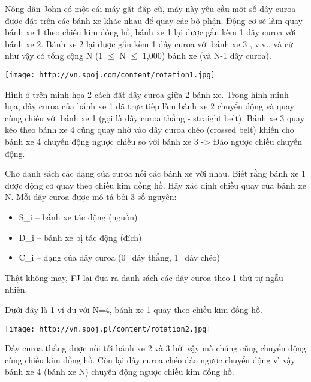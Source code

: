 Nông dân John có một cái máy gặt đập cũ, máy này yêu cầu một số dây  curoa được đặt trên các bánh xe khác nhau để quay các bộ phận. Động cơ sẽ làm quay bánh xe 1 theo chiều kim đồng hồ, bánh xe 1 lại được gắn kèm 1  dây curoa với bánh xe 2. Bánh xe 2 lại được gắn kèm 1 dây curoa với bánh xe 3  , v.v.. và cứ như vậy có tổng cộng N (1  $\le$  N  $\le$  1,000) bánh xe (và N-1 dây curoa).  


\texttt{[image: http://vn.spoj.com/content/rotation1.jpg]}

   Hình ở trên minh họa 2 cách đặt dây curoa giữa 2 bánh xe. Trong hình minh họa, dây curoa của bánh xe 1 đã trực tiếp làm bánh xe 2 chuyển động và quay cùng chiều với bánh xe 1 (gọi là dây curoa thẳng - straight belt). Bánh xe 3 quay kéo theo bánh xe 4 cũng quay nhờ vào dây curoa chéo (crossed belt) khiến cho bánh xe 4 chuyển động ngược chiều so với bánh xe 3 -> Đảo  ngược chiều chuyển động.  

   Cho danh sách các dạng của curoa nối các bánh xe với nhau.  Biết rằng bánh xe 1 được động cơ quay theo chiều kim đồng hồ. Hãy xác định chiều quay của bánh xe N. Mỗi dây curoa được mô tả bởi 3 số nguyên:  
\begin{itemize}
	\item     S\_i -- bánh xe tác động (nguồn)   
	\item     D\_i -- bánh xe bị tác động (đích)   
	\item     C\_i -- dạng của dây curoa (0=dây thẳng, 1=dây chéo)   
\end{itemize}

   Thật không may, FJ lại đưa ra danh sách các dây curoa theo 1 thứ tự ngẫu nhiên.  

   Dưới đây là 1 ví dụ với N=4, bánh xe 1 quay theo chiều kim đồng hồ.  


\texttt{[image: http://vn.spoj.pl/content/rotation2.jpg]}

   Dây curoa thẳng được nối tới bánh xe 2 và 3 bởi vậy mà chúng cũng chuyển động cùng chiều kim đồng hồ. Còn lại dây curoa chéo đảo ngược chuyển động vì vậy  bánh xe 4 (bánh xe N) chuyển động ngược chiều kim đồng hồ.